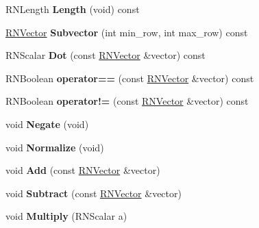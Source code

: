 \begin{DoxyCompactItemize}
\item 
R\+N\+Length {\bfseries Length} (void) const \hypertarget{class_r_n_vector_a9dd2ed84f26f9b0fe47ca7626130ba78}{}\label{class_r_n_vector_a9dd2ed84f26f9b0fe47ca7626130ba78}

\item 
\hyperlink{class_r_n_vector}{R\+N\+Vector} {\bfseries Subvector} (int min\+\_\+row, int max\+\_\+row) const \hypertarget{class_r_n_vector_ac629740e0372ab6661e9eb82956652be}{}\label{class_r_n_vector_ac629740e0372ab6661e9eb82956652be}

\item 
R\+N\+Scalar {\bfseries Dot} (const \hyperlink{class_r_n_vector}{R\+N\+Vector} \&vector) const \hypertarget{class_r_n_vector_a7e181e231a4568834ae2231179277f77}{}\label{class_r_n_vector_a7e181e231a4568834ae2231179277f77}

\item 
R\+N\+Boolean {\bfseries operator==} (const \hyperlink{class_r_n_vector}{R\+N\+Vector} \&vector) const \hypertarget{class_r_n_vector_a28ca1a318f959f238b398baf39586224}{}\label{class_r_n_vector_a28ca1a318f959f238b398baf39586224}

\item 
R\+N\+Boolean {\bfseries operator!=} (const \hyperlink{class_r_n_vector}{R\+N\+Vector} \&vector) const \hypertarget{class_r_n_vector_abaff644515ac34005ab1e50fd4bddeed}{}\label{class_r_n_vector_abaff644515ac34005ab1e50fd4bddeed}

\item 
void {\bfseries Negate} (void)\hypertarget{class_r_n_vector_a6cfc29e3cbe7fa541ba6c66a19424306}{}\label{class_r_n_vector_a6cfc29e3cbe7fa541ba6c66a19424306}

\item 
void {\bfseries Normalize} (void)\hypertarget{class_r_n_vector_a5d62dbc3a616d78f7cc15a73dd6d10ff}{}\label{class_r_n_vector_a5d62dbc3a616d78f7cc15a73dd6d10ff}

\item 
void {\bfseries Add} (const \hyperlink{class_r_n_vector}{R\+N\+Vector} \&vector)\hypertarget{class_r_n_vector_a967fd380c3549e9fb1acbb15783346de}{}\label{class_r_n_vector_a967fd380c3549e9fb1acbb15783346de}

\item 
void {\bfseries Subtract} (const \hyperlink{class_r_n_vector}{R\+N\+Vector} \&vector)\hypertarget{class_r_n_vector_a093564093d3e2a897d8c25f430c43831}{}\label{class_r_n_vector_a093564093d3e2a897d8c25f430c43831}

\item 
void {\bfseries Multiply} (R\+N\+Scalar a)\hypertarget{class_r_n_vector_a25d452e83208adef142a29b6d77e94fe}{}\label{class_r_n_vector_a25d452e83208adef142a29b6d77e94fe}


\end{DoxyCompactItemize}
